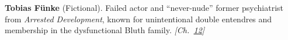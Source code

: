 \textbf{Tobias Fünke} (Fictional). Failed actor and ``never-nude'' former psychiatrist from \emph{Arrested Development}, known for unintentional double entendres and membership in the dysfunctional Bluth family. \emph{[Ch.~\hyperref[ch:gsmencryptionorder]{12}]}

